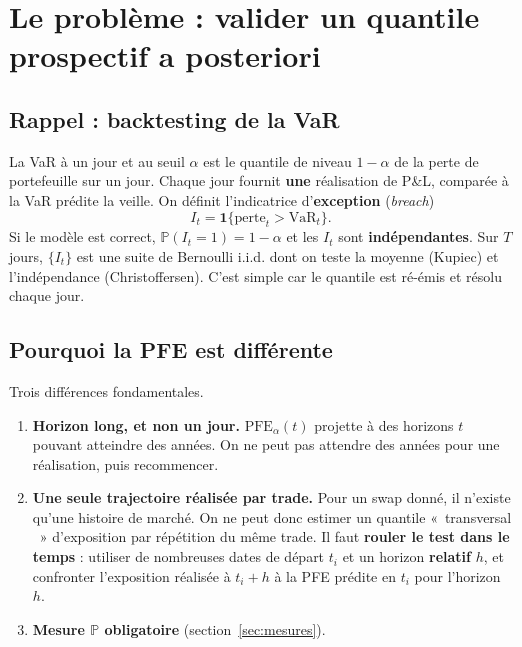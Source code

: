 \documentclass[11pt,a4paper]{article}
\providecommand{\og}{«~}
\providecommand{\fg}{~»}
\newcommand{\PFE}{\mathrm{PFE}}
\newcommand{\Prob}{\mathbb{P}}
\newcommand{\Indic}{\mathbf{1}}
\theoremstyle{remark}
\begin{document}
\section{Le problème : valider un quantile prospectif a posteriori}
\label{sec:probleme}

\subsection{Rappel : backtesting de la VaR}

La VaR à un jour et au seuil $\alpha$ est le quantile de niveau $1-\alpha$ de la perte de portefeuille sur un jour. Chaque jour fournit \textbf{une} réalisation de P\&L, comparée à la VaR prédite la veille. On définit l'indicatrice d'\textbf{exception} (\emph{breach})
\begin{equation}
I_t = \Indic\{\text{perte}_t > \mathrm{VaR}_t\}.
\end{equation}
Si le modèle est correct, $\Prob(I_t = 1) = 1-\alpha$ et les $I_t$ sont \textbf{indépendantes}. Sur $T$ jours, $\{I_t\}$ est une suite de Bernoulli i.i.d. dont on teste la moyenne (Kupiec) et l'indépendance (Christoffersen). C'est simple car le quantile est ré-émis et résolu chaque jour.

\subsection{Pourquoi la PFE est différente}

Trois différences fondamentales.
\begin{enumerate}[nosep]
  \item \textbf{Horizon long, et non un jour.} $\PFE_\alpha(t)$ projette à des horizons $t$ pouvant atteindre des années. On ne peut pas attendre des années pour une réalisation, puis recommencer.
  \item \textbf{Une seule trajectoire réalisée par trade.} Pour un swap donné, il n'existe qu'une histoire de marché. On ne peut donc estimer un quantile \og transversal \fg{} d'exposition par répétition du même trade. Il faut \textbf{rouler le test dans le temps} : utiliser de nombreuses dates de départ $t_i$ et un horizon \textbf{relatif} $h$, et confronter l'exposition réalisée à $t_i + h$ à la PFE prédite en $t_i$ pour l'horizon $h$.
  \item \textbf{Mesure $\Prob$ obligatoire} (section~\ref{sec:mesures}).
\end{enumerate}
\end{document}
